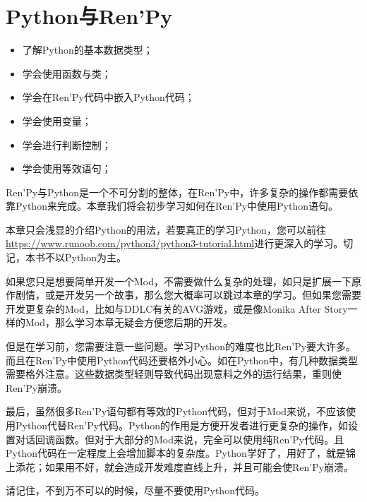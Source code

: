 \chapter{Python与Ren'Py}
\begin{ChapterGoals}
    \begin{itemize}
        \item 了解Python的基本数据类型；
        \item 学会使用函数与类；
        \item 学会在Ren'Py代码中嵌入Python代码；
        \item 学会使用变量；
        \item 学会进行判断控制；
        \item 学会使用等效语句；
    \end{itemize}
\end{ChapterGoals}

Ren'Py与Python是一个不可分割的整体，在Ren'Py中，许多复杂的操作都需要依靠Python来完成。本章我们将会初步学习如何在Ren'Py中使用Python语句。

\begin{Attention}
    本章只会浅显的介绍Python的用法，若要真正的学习Python，您可以前往\url{https://www.runoob.com/python3/python3-tutorial.html}进行更深入的学习。切记，本书不以Python为主。
\end{Attention}

\begin{Warning}
    如果您只是想要简单开发一个Mod，不需要做什么复杂的处理，如只是扩展一下原作剧情，或是开发另一个故事，那么您大概率可以跳过本章的学习。但如果您需要开发更复杂的Mod，比如与DDLC有关的AVG游戏，或是像Monika After Story一样的Mod，那么学习本章无疑会方便您后期的开发。

    但是在学习前，您需要注意一些问题。学习Python的难度也比Ren'Py要大许多。而且在Ren'Py中使用Python代码还要格外小心。如在Python中，有几种数据类型需要格外注意。这些数据类型轻则导致代码出现意料之外的运行结果，重则使Ren'Py崩溃。

    最后，虽然很多Ren'Py语句都有等效的Python代码，但对于Mod来说，不应该使用Python代替Ren'Py代码。Python的作用是方便开发者进行更复杂的操作，如设置对话回调函数。但对于大部分的Mod来说，完全可以使用纯Ren'Py代码。且Python代码在一定程度上会增加脚本的复杂度。Python学好了，用好了，就是锦上添花；如果用不好，就会造成开发难度直线上升，并且可能会使Ren'Py崩溃。

    请记住，不到万不可以的时候，尽量不要使用Python代码。
\end{Warning}






